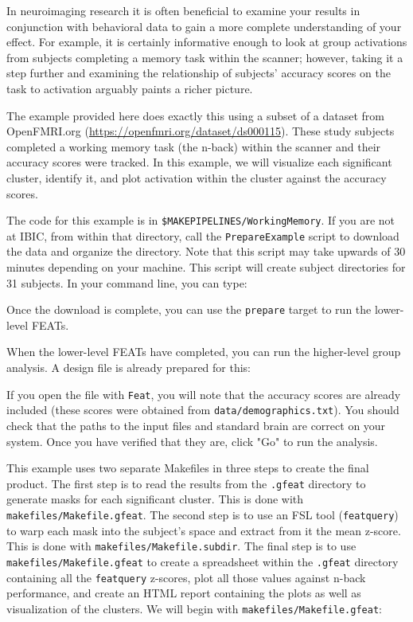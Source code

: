 \label{sec:groupfeatreport}
In neuroimaging research it is often beneficial to examine your results in conjunction with behavioral data to gain a more complete understanding of your effect. For example, it is certainly informative enough to look at group activations from subjects completing a memory task within the scanner; however, taking it a step further and examining the relationship of subjects' accuracy scores on the task to activation arguably paints a richer picture. 

The example provided here does exactly this using a subset of a dataset from OpenFMRI.org (\url{https://openfmri.org/dataset/ds000115}). These study subjects completed a working memory task (the n-back) within the scanner and their accuracy scores were tracked. In this example, we will visualize each significant cluster, identify it, and plot activation within the cluster against the accuracy scores. 

The code for this example is in \texttt{\$MAKEPIPELINES/WorkingMemory}. If you are not at IBIC, from within that directory, call the \texttt{PrepareExample} script to download the data and organize the directory. Note that this script may take upwards of 30 minutes depending on your machine. This script will create subject directories for 31 subjects. In your command line, you can type: 

Once the download is complete, you can use the \texttt{prepare} target to run the lower-level FEATs.

When the lower-level FEATs have completed, you can run the higher-level group analysis. A design file is already prepared for this:

If you open the file with \texttt{Feat}, you will note that the accuracy scores are already included (these scores were obtained from \texttt{data/demographics.txt}). You should check that the paths to the input files and standard brain are correct on your system. Once you have verified that they are, click "Go" to run the analysis. 

This example uses two separate Makefiles in three steps to create the final product. The first step is to read the results from the \texttt{.gfeat} directory to generate masks for each significant cluster. This is done with \texttt{makefiles/Makefile.gfeat}. The second step is to use an FSL tool (\texttt{featquery}) to warp each mask into the subject's space and extract from it the mean z-score. This is done with \texttt{makefiles/Makefile.subdir}. The final step is to use \texttt{makefiles/Makefile.gfeat} to create a spreadsheet within the \texttt{.gfeat} directory containing all the \texttt{featquery} z-scores, plot all those values against n-back performance, and create an HTML report containing the plots as well as visualization of the clusters. We will begin with \texttt{makefiles/Makefile.gfeat}:

